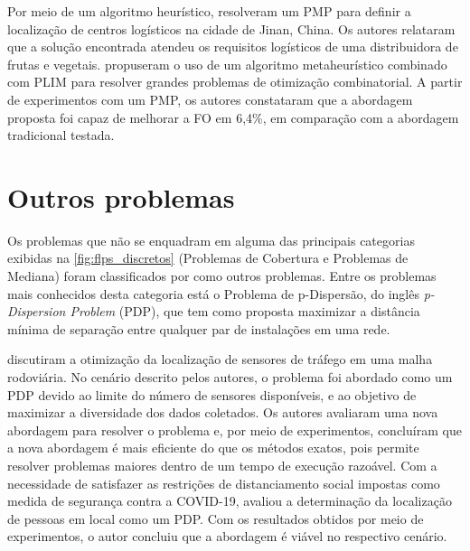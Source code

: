 Por meio de um algoritmo heurístico, \textcite{Tang2020} resolveram um PMP para definir a localização de centros logísticos na cidade de Jinan, China. Os autores relataram que a solução encontrada atendeu os requisitos logísticos de uma distribuidora de frutas e vegetais. \textcite{Jnokov2017} propuseram o uso de um algoritmo metaheurístico combinado com PLIM para resolver grandes problemas de otimização combinatorial. A partir de experimentos com um PMP, os autores constataram que a abordagem proposta foi capaz de melhorar a FO em 6,4\%, em comparação com a abordagem tradicional testada.

\section{Outros problemas}

Os problemas que não se enquadram em alguma das principais categorias exibidas na \autoref{fig:flps_discretos} (Problemas de Cobertura e Problemas de Mediana) foram classificados por \textcite{Eiselt2011, AhmadiJavid2017} como outros problemas. Entre os problemas mais conhecidos desta categoria está o Problema de p-Dispersão, do inglês \textit{p-Dispersion Problem} (PDP), que tem como proposta maximizar a distância mínima de separação entre qualquer par de instalações em uma rede.


\textcite{Sayyady2016} discutiram a otimização da localização de sensores de tráfego em uma malha rodoviária. No cenário descrito pelos autores, o problema foi abordado como um PDP devido ao limite do número de sensores disponíveis, e ao objetivo de maximizar a diversidade dos dados coletados. Os autores avaliaram uma  nova abordagem para resolver o problema e, por meio de experimentos, concluíram que a nova abordagem é mais eficiente do que os métodos exatos, pois permite resolver problemas maiores dentro de um tempo de execução razoável. Com a necessidade de satisfazer as restrições de distanciamento social impostas como medida de segurança contra a COVID-19, \textcite{Kudela2020} avaliou a determinação da localização de pessoas em local como um PDP. Com os resultados obtidos por meio de experimentos, o autor concluiu que a abordagem é viável no respectivo cenário.




